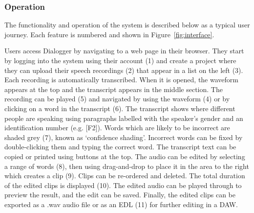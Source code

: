 
\subsubsection{Operation}
The functionality and operation of the system is described below as a typical user journey. Each
feature is numbered and shown in Figure~\ref{fig:interface}.

Users access Dialogger by navigating to a web page in their browser. They start by logging into the system using their
account (1) and create a project where they can upload their speech recordings (2) that appear in a list on the left
(3). Each recording is automatically transcribed. When it is opened, the waveform appears at the top and the transcript
appears in the middle section.  The recording can be played (5) and navigated by using the waveform (4) or by clicking
on a word in the transcript (6). The transcript shows where different people are speaking using paragraphs labelled
with the speaker's gender and an identification number (e.g. [F2]). Words which are likely to be incorrect are shaded grey
(7), known as `confidence shading'.  Incorrect words can be fixed by double-clicking them and typing the correct word.
The transcript text can be copied or printed using buttons at the top. The audio can be edited by selecting a range of
words (8), then using drag-and-drop to place it in the area to the right which creates a clip (9).  Clips can be
re-ordered and deleted. The total duration of the edited clips is displayed (10). The edited audio can be played
through to preview the result, and the edit can be saved. Finally, the edited clips can be exported as a .wav audio
file or as an EDL (11) for further editing in a DAW.




